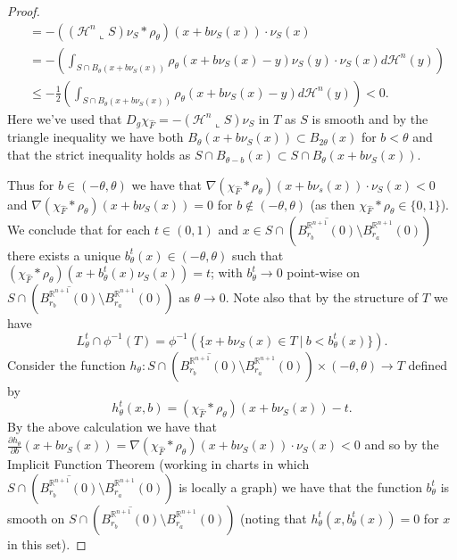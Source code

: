 \documentclass[11pt]{article}
\begin{document}
\begin{proof}
\begin{align*}
    &= -((\mathcal{H}^{n}\llcorner S) \nu_S * \rho_\theta)(x + b\nu_S(x)) \cdot \nu_S(x)\\
    &= -\left(\int_{S \cap B_\theta(x + b\nu_S(x))} \rho_\theta (x + b\nu_S(x) - y)\nu_S(y)\cdot \nu_S(x)  d\mathcal{H}^n(y)\right) \\
    & \leq -\frac{1}{2}\left( \int_{S \cap B_\theta(x + b\nu_S(x))} \rho_\theta (x + b\nu_S(x) - y) d\mathcal{H}^n(y) \right) < 0.
\end{align*}
Here we've used that $D_g \chi_{\widehat{F}} = -(\mathcal{H}^n \llcorner S) \nu_S$ in $T$ as $S$ is smooth and by the triangle inequality we have both $ B_{\theta}(x + b\nu_S(x)) \subset B_{2\theta}(x)$ for $b < \theta$ and that the strict inequality holds as $S \cap B_{\theta - b}(x) \subset S \cap B_\theta (x + b\nu_S(x))$.

\bigskip

Thus for $b \in (-\theta,\theta)$ we have that $\nabla (\chi_{\widehat{F}} * \rho_\theta)(x + b\nu_s(x)) \cdot \nu_S(x) < 0$ and $\nabla (\chi_{\widehat{F}} * \rho_\theta)(x + b\nu_S(x)) = 0$ for $b \notin (-\theta,\theta)$ (as then $\chi_{\widehat{F}} * \rho_\theta \in \{0,1\}$). We conclude that for each $t \in (0,1)$ and $x \in S \cap (\overline{B_{r_b}^{\mathbb{R}^{n+1}}(0)} \setminus B_{r_a}^{\mathbb{R}^{n+1}}(0))$ there exists a unique $b_\theta^t(x) \in (-\theta, \theta)$ such that $(\chi_{\widehat{F}} * \rho_\theta )(x + b_\theta^t(x)\nu_S (x)) = t$; with $b^t_\theta \rightarrow 0$ point-wise on $S \cap (\overline{B_{r_b}^{\mathbb{R}^{n+1}}(0)} \setminus B_{r_a}^{\mathbb{R}^{n+1}}(0))$ as $\theta \rightarrow 0$. Note also that by the structure of $T$ we have
\begin{equation}\label{eqn: L^t_theta in T}
    L^t_\theta \cap \phi^{-1}(T) =  \phi^{-1}(\{x + b\nu_S(x) \in T \: | \: b < b^t_\theta(x)\}).
\end{equation}
Consider the function $h_\theta : S \cap (\overline{B_{r_b}^{\mathbb{R}^{n+1}}(0)} \setminus B_{r_a}^{\mathbb{R}^{n+1}}(0)) \times (-\theta,\theta) \rightarrow T$ defined by \begin{equation*}
    h^t_\theta(x,b) = (\chi_{\widehat{F}}*\rho_\theta)(x + b\nu_S(x)) - t.
\end{equation*} 
By the above calculation we have that $\frac{\partial h_\theta}{\partial b}(x + b\nu_S(x)) = \nabla (\chi_{\widehat{F}}*\rho_\theta)(x + b\nu_S(x)) \cdot \nu_S(x) < 0$ and so by the Implicit Function Theorem (working in charts in which $S \cap (\overline{B_{r_b}^{\mathbb{R}^{n+1}}(0)} \setminus B_{r_a}^{\mathbb{R}^{n+1}}(0))$ is locally a graph) we have that the function $b^t_\theta$ is smooth on $S \cap (\overline{B_{r_b}^{\mathbb{R}^{n+1}}(0)} \setminus B_{r_a}^{\mathbb{R}^{n+1}}(0))$ (noting that $h^t_\theta(x,b^t_\theta(x)) = 0$ for $x$ in this set). 


\end{proof}
\end{document}
